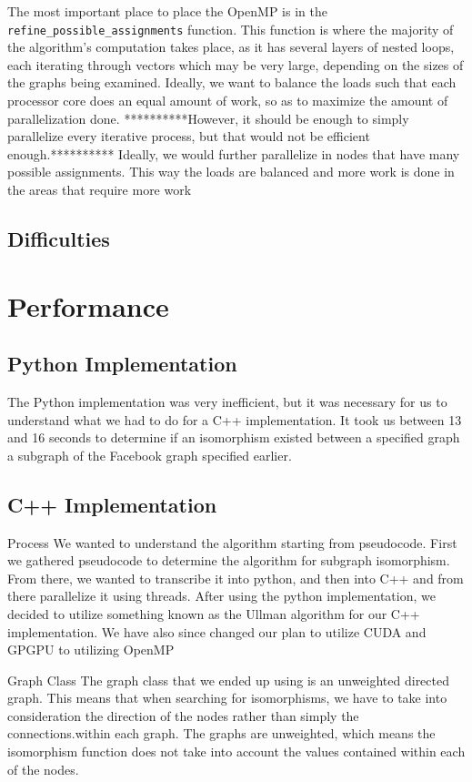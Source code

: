 \documentclass{article}
\begin{document}
  The most important place to place the OpenMP is in the \texttt{refine\_possible\_assignments} function. This function is where the majority of the algorithm's computation takes place, as it has several layers of nested loops, each iterating through vectors which may be very large, depending on the sizes of the graphs being examined. Ideally, we want to balance the loads such that each processor core does an equal amount of work, so as to maximize the amount of parallelization done. **********However, it should be enough to simply parallelize every iterative process, but that would not be efficient enough.********** Ideally, we would further parallelize in nodes that have many possible assignments. This way the loads are balanced and more work is done in the areas that require more work

  \subsection{Difficulties}

\section{Performance}

  \subsection{Python Implementation}
  The Python implementation was very inefficient, but it was necessary for us to understand what we had to do for a C++ implementation. It took us between 13 and 16 seconds to determine if an isomorphism existed between a specified graph a subgraph of the Facebook graph specified earlier.

  \subsection{C++ Implementation}

Process
We wanted to understand the algorithm starting from pseudocode. First we gathered pseudocode to determine the algorithm for subgraph isomorphism. From there, we wanted to transcribe it into python, and then into C++ and from there parallelize it using threads. After using the python implementation, we decided to utilize something known as the Ullman algorithm for our C++ implementation. We have also since changed our plan to utilize CUDA and GPGPU to utilizing OpenMP

Graph Class
The graph class that we ended up using is an unweighted directed graph. This means that when searching for isomorphisms, we have to take into consideration the direction of the nodes rather than simply the connections.within each graph. The graphs are unweighted, which means the isomorphism function does not take into account the values contained within each of the nodes.

  \printbibliography[heading=bibintoc,
                     title={References}]
\end{document}
